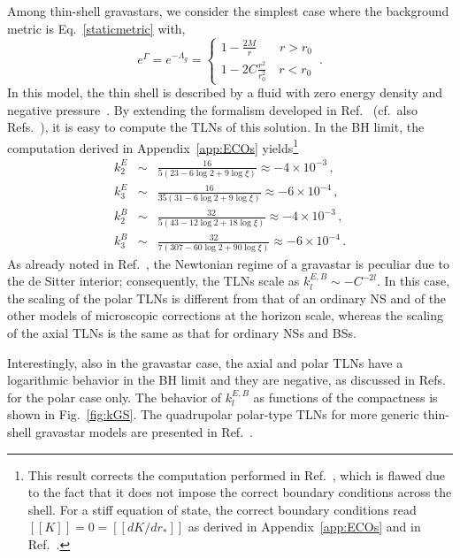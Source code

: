 \documentclass[aps,twocolumn,showpacs,preprintnumbers,nofootinbib,prd,superscriptaddress,groupedaddress,10pt]{revtex4-1}
\begin{document}
Among thin-shell gravastars, we consider the simplest case where the background metric is  Eq.~\eqref{staticmetric} with,
\begin{equation}
e^{\Gamma}=e^{-\Lambda_g}=\left\{\begin{array}{l}
                                1-\frac{2M}{r} \quad \;\;\; r>r_0\\
                                1-2C\frac{r^2}{r_0^2} \quad r<r_0
                               \end{array}\right. \,.
\end{equation}
In this model, the thin shell is described by a fluid with zero energy density and negative pressure~\cite{Pani:2015tga}. 
%
By extending the formalism developed in Ref.~\cite{Uchikata:2016qku} (cf.\ also Refs.~\cite{Uchikata:2015yma,Pani:2015tga}), it is easy to compute the TLNs of this solution.
%
In the BH limit, the computation derived in Appendix~\ref{app:ECOs} yields\footnote{This result corrects the computation performed in Ref.~\cite{Pani:2015tga}, which is flawed due to the fact that it does not impose the correct boundary conditions across the shell. For a stiff equation of state, the correct boundary conditions read $[[K]]=0=[[d K/dr_*]]$ as derived in Appendix~\ref{app:ECOs} and in Ref.~\cite{Uchikata:2016qku}.}
%
\begin{eqnarray}
 k_2^E &\sim& \frac{16}{5 (23-6\log{2}+9 \log\xi)}\approx-4\times10^{-3}\,,\\
 k_3^E &\sim& \frac{16}{35 (31-6 \log{2}+9 \log\xi)} \approx -6\times 10^{-4}\,,\\
 k_2^B &\sim&\frac{32}{5 (43-12\log{2}+18\log\xi)}\approx-4\times10^{-3}\,,\\
 k_3^B &\sim&\frac{32}{7 (307-60 \log{2}+90 \log\xi)}\approx -6\times 10^{-4}\,.
\end{eqnarray}
%
As already noted in Ref.~\cite{Pani:2015tga}, the Newtonian regime of a gravastar is peculiar due to the de Sitter interior; consequently, the TLNs scale as $k_l^{E,B}\sim -C^{-2l}$. In this case, the scaling of the polar TLNs is different from that of an ordinary NS and of the other models of microscopic corrections at the horizon scale, whereas the scaling of the axial TLNs is the same as that for ordinary NSs and BSs.


Interestingly, also in the gravastar case, the axial and polar TLNs have a logarithmic behavior in the BH limit and they are negative, as discussed in Refs.~\cite{Pani:2015tga,Uchikata:2016qku} for the polar case only. The behavior of $k_l^{E,B}$ as functions of the compactness is shown in Fig.~\ref{fig:kGS}. The quadrupolar polar-type TLNs for more generic thin-shell gravastar models are presented in Ref.~\cite{Uchikata:2016qku}.
\end{document}
